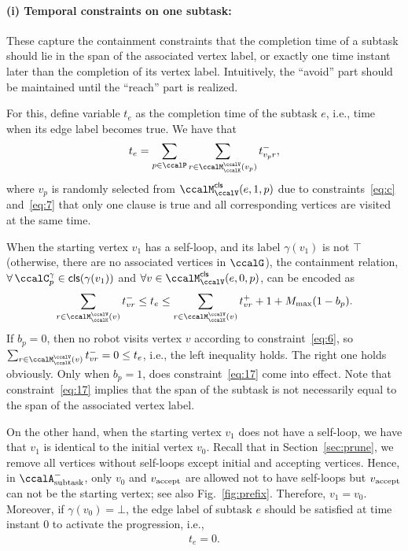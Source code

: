 \documentclass[Afour,sageh,times]{sagej}
\newcommand{\clause}[1]{\mathsf{cls}(#1)}
\newcommand{\auto}[1]{\ccalA_{\textup{#1}}}
\newcommand{\vertex}[1]{v_{\textup{#1}}}
\begin{document}
{{{{{\paragraph{(i) Temporal constraints on one subtask:}\label{sec:onesubtask} These capture the containment constraints that the completion time of a subtask should lie in the span of the associated vertex label, or exactly one time instant later than the completion of its vertex label. Intuitively, the ``avoid'' part should be maintained until the ``reach'' part is realized.

For this, define variable  $t_e$ as the completion time of the subtask $e$, i.e., time when its edge label  becomes true. We have  that
\begingroup\makeatletter\def\f@size{10}\check@mathfonts
\def\maketag@@@#1{\hbox{\m@th\normalsize\normalfont#1}}%
\begin{align}\label{eq:edgetime}
  t_e = \sum_{p\in \ccalP} \sum_{r\in \ccalM^\ccalV_{\ccalK}(v_p)}t_{v_p r}^-,
\end{align}
\endgroup
where $v_p$ is randomly selected from $\ccalM^\mathsf{cls}_\ccalV(e,1,p)$ due to constraints~\eqref{eq:c} and~\eqref{eq:7} that only one clause is true and all corresponding vertices are visited at the same time.

When the starting vertex $v_1$ has a self-loop, and its label $\gamma(v_1)$ is not  $\top$ (otherwise, there are no associated vertices in $\ccalG$), the containment relation, $\forall\, \ccalC_p^{\gamma} \in \clause{\gamma(v_1)}$ and $\forall v \in \ccalM^\mathsf{cls}_\ccalV(e,0,p)$, can be encoded as
\begingroup\makeatletter\def\f@size{10}\check@mathfonts
\def\maketag@@@#1{\hbox{\m@th\normalsize\normalfont#1}}%
  \begin{align}
 \sum_{r\in \ccalM^\ccalV_{\ccalK}(v)} t_{vr}^-   \leq  t_e \leq
    \sum_{r\in \ccalM^\ccalV_{\ccalK}(v)} t_{vr}^+ + 1  + M_{\text{max}} (1 - b_{p}). \label{eq:17}
  \end{align}
  \endgroup
  If $b_p=0$, then no robot visits vertex $v$ according to constraint~\eqref{eq:6}, so~$ \sum_{r\in \ccalM^\ccalV_{\ccalK}(v)} t_{vr}^- = 0 \leq t_e$, i.e., the left inequality holds. The right one holds obviously. Only when $b_p=1$, does constraint~\eqref{eq:17} come into effect. Note that constraint~\eqref{eq:17} implies that the span of the subtask is not necessarily equal to the span of the associated vertex label.

  On the other hand, when the starting vertex $v_1$ does not have a self-loop, we have that $v_1$ is identical to the initial vertex $v_0$. Recall that in Section~\ref{sec:prune}, we remove all vertices without self-loops except initial and accepting vertices. Hence, in $\auto{subtask}^-$, only $v_0$ and $\vertex{accept}$ are allowed not to have self-loops but $\vertex{accept}$ can not be the starting vertex; see also Fig.~\ref{fig:prefix}. Therefore, $v_1 = v_0$. Moreover, if $\gamma(v_0) = \bot$, the edge label of subtask $e$ should be satisfied at time instant 0 to activate the progression, i.e.,
  \begingroup\makeatletter\def\f@size{10}\check@mathfonts
\def\maketag@@@#1{\hbox{\m@th\normalsize\normalfont#1}}%
  \begin{align}
 t_e = 0. \label{eq:tis0}
  \end{align}
  \endgroup


}}}}}
\end{document}
